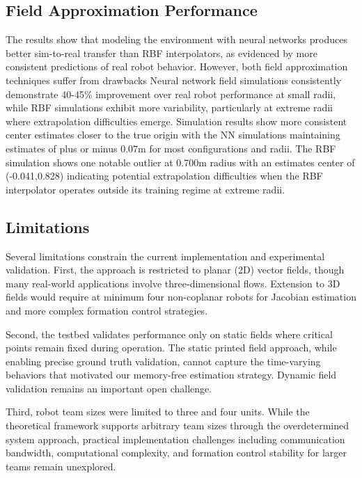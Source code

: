 \documentclass[lettersize,journal]{IEEEtran}
\begin{document}
\subsection{Field Approximation Performance}

The results show that modeling the environment with neural networks produces better sim-to-real transfer than RBF interpolators, as evidenced by more consistent predictions of real robot behavior. However, both field approximation techniques suffer from drawbacks Neural network field simulations consistently demonstrate 40-45\% improvement over real robot performance at small radii, while RBF simulations exhibit more variability, particularly at extreme radii where extrapolation difficulties emerge. Simulation results show more consistent center estimates closer to the true origin with the NN simulations maintaining estimates of plus or minus 0.07m for most configurations and radii. The RBF simulation shows one notable outlier at 0.700m radius with an estimates center of (-0.041,0.828) indicating potential extrapolation difficulties when the RBF interpolator operates outside its training regime at extreme radii.




\subsection{Limitations}

Several limitations constrain the current implementation and experimental validation. First, the approach is restricted to planar (2D) vector fields, though many real-world applications involve three-dimensional flows. Extension to 3D fields would require at minimum four non-coplanar robots for Jacobian estimation and more complex formation control strategies.

Second, the testbed validates performance only on static fields where critical points remain fixed during operation. The static printed field approach, while enabling precise ground truth validation, cannot capture the time-varying behaviors that motivated our memory-free estimation strategy. Dynamic field validation remains an important open challenge.

Third, robot team sizes were limited to three and four units. While the theoretical framework supports arbitrary team sizes through the overdetermined system approach, practical implementation challenges including communication bandwidth, computational complexity, and formation control stability for larger teams remain unexplored.
\end{document}
